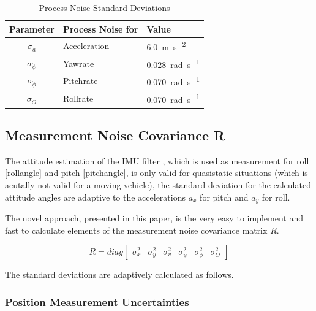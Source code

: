 \documentclass[a4paper,twoside]{article}
\begin{document}
\begin{table}[ht]
\renewcommand{\arraystretch}{1.3}
\caption{Process Noise Standard Deviations}
\label{processnoisetable}
\centering
\begin{tabular}{c l l}
\hline
Parameter & Process Noise for & Value\\
\hline
$\sigma_a$ & Acceleration & \SI{6.0}{\metre\per\square\second} \\
$\sigma_{\dot \psi}$ & Yawrate & \SI{0.028}{\radian\per\second}\\
$\sigma_{\dot \phi}$ & Pitchrate & \SI{0.070}{\radian\per\second}\\
$\sigma_{\dot \Theta}$ & Rollrate & \SI{0.070}{\radian\per\second}\\
\hline
\end{tabular}
\end{table}

\subsection{Measurement Noise Covariance R}

The attitude estimation of the IMU filter \cite{Madgwick2010}, which is used as measurement for roll \eqref{rollangle} and pitch \eqref{pitchangle}, is only valid for quasistatic situations (which is acutally not valid for a moving vehicle), the standard deviation for the calculated attitude angles are adaptive to the accelerations $a_x$ for pitch and $a_y$ for roll.

The novel approach, presented in this paper, is the very easy to implement and fast to calculate elements of the measurement noise covariance matrix $R$.

\begin{equation}\label{R}R=diag\left[\begin{matrix}\sigma_{x}^2 & \sigma_{y}^2 & \sigma_{v}^2 & \sigma_{\psi}^2 & \sigma_{\phi}^2 & \sigma_{\Theta}^2 \end{matrix}\right]\end{equation}

The standard deviations are adaptively calculated as follows.

\subsubsection{Position Measurement Uncertainties}
\end{document}
